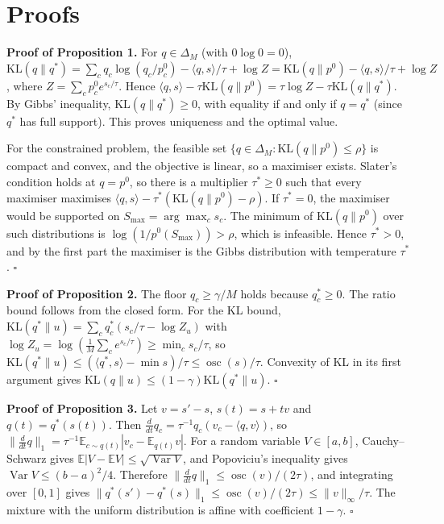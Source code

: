 \documentclass[mathematics,article,submit,pdftex,moreauthors]{Definitions/mdpi}
\begin{document}
\appendixstart\appendix

\section{Proofs}

\textbf{Proof of Proposition 1.} For $q\in\Delta_M$ (with $0\log 0=0$), $\mathrm{KL}(q\|q^{*})=\sum_c q_c\log(q_c/p^{0}_c)-\langle q,s\rangle/\tau+\log Z=\mathrm{KL}(q\|p^{0})-\langle q,s\rangle/\tau+\log Z$, where $Z=\sum_c p^{0}_c e^{s_c/\tau}$. Hence $\langle q,s\rangle-\tau\mathrm{KL}(q\|p^{0})=\tau\log Z-\tau\mathrm{KL}(q\|q^{*})$. By Gibbs' inequality, $\mathrm{KL}(q\|q^{*})\ge 0$, with equality if and only if $q=q^{*}$ (since $q^{*}$ has full support). This proves uniqueness and the optimal value.

For the constrained problem, the feasible set $\{q\in\Delta_M:\mathrm{KL}(q\|p^{0})\le\rho\}$ is compact and convex, and the objective is linear, so a maximiser exists. Slater's condition holds at $q=p^{0}$, so there is a multiplier $\tau^{*}\ge 0$ such that every maximiser maximises $\langle q,s\rangle-\tau^{*}(\mathrm{KL}(q\|p^{0})-\rho)$. If $\tau^{*}=0$, the maximiser would be supported on $S_{\max}=\arg\max_c s_c$. The minimum of $\mathrm{KL}(q\|p^{0})$ over such distributions is $\log(1/p^{0}(S_{\max}))>\rho$, which is infeasible. Hence $\tau^{*}>0$, and by the first part the maximiser is the Gibbs distribution with temperature $\tau^{*}$. $\square$

\textbf{Proof of Proposition 2.} The floor $q_c\ge\gamma/M$ holds because $q^{*}_c\ge 0$. The ratio bound follows from the closed form. For the KL bound, $\mathrm{KL}(q^{*}\|u)=\sum_c q^{*}_c(s_c/\tau-\log Z_u)$ with $\log Z_u=\log(\frac1M\sum_c e^{s_c/\tau})\ge\min_c s_c/\tau$, so $\mathrm{KL}(q^{*}\|u)\le(\langle q^{*},s\rangle-\min s)/\tau\le\operatorname{osc}(s)/\tau$. Convexity of KL in its first argument gives $\mathrm{KL}(q\|u)\le(1-\gamma)\mathrm{KL}(q^{*}\|u)$. $\square$

\textbf{Proof of Proposition 3.} Let $v=s'-s$, $s(t)=s+tv$ and $q(t)=q^{*}(s(t))$. Then $\frac{d}{dt}q_c=\tau^{-1}q_c(v_c-\langle q,v\rangle)$, so $\|\frac{d}{dt}q\|_1=\tau^{-1}\mathbb{E}_{c\sim q(t)}|v_c-\mathbb{E}_{q(t)}v|$. For a random variable $V\in[a,b]$, Cauchy--Schwarz gives $\mathbb{E}|V-\mathbb{E}V|\le\sqrt{\operatorname{Var}V}$, and Popoviciu's inequality gives $\operatorname{Var}V\le(b-a)^2/4$. Therefore $\|\frac{d}{dt}q\|_1\le\operatorname{osc}(v)/(2\tau)$, and integrating over $[0,1]$ gives $\|q^{*}(s')-q^{*}(s)\|_1\le\operatorname{osc}(v)/(2\tau)\le\|v\|_\infty/\tau$. The mixture with the uniform distribution is affine with coefficient $1-\gamma$. $\square$
\end{document}
